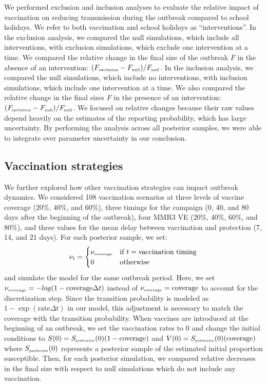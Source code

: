 \documentclass[12pt]{article}
\newcommand{\tsub}[2]{#1_{{\textrm{\tiny #2}}}}
\begin{document}
We performed exclusion and inclusion analyses to evaluate the relative impact of vaccination on reducing transmission during the outbreak compared to school holidays.
We refer to both vaccination and school holidays as ``interventions''.
In the exclusion analysis, we compared the null simulations, which include all interventions, with exclusion simulations, which exclude one intervention at a time.
We compared the relative change in the final size of the outbreak $F$ in the absence of an intervention: $(\tsub{F}{exclusion}-\tsub{F}{null})/\tsub{F}{null}$.
In the inclusion analysis, we compared the null simulations, which include no interventions, with inclusion simulations, which include one intervention at a time.
We also compared the relative change in the final sizes $F$ in the presence of an intervention: $(\tsub{F}{inclusion}-\tsub{F}{null})/\tsub{F}{null}$.
We focused on relative changes because their raw values depend heavily on the estimates of the reporting probability, which has large uncertainty.
By performing the analysis across all posterior samples, we were able to integrate over parameter uncertainty in our conclusion.

\subsection{Vaccination strategies}

We further explored how other vaccination strategies can impact outbreak dynamics.
We considered 108 vaccination scenarios at three levels of vaccine coverage (20\%, 40\%, and 60\%), three timings for the campaign (0, 40, and 80 days after the beginning of the outbreak), four MMR3 VE (20\%, 40\%, 60\%, and 80\%), and three values for the mean delay between vaccination and protection (7, 14, and 21 days).
For each posterior sample, we set:
\begin{equation}
\nu_t = \begin{cases}
\tsub{\nu}{coverage} & \textrm{if } t = \textrm{vaccination timing}\\
0 & \textrm{otherwise}
\end{cases}
\end{equation}
and simulate the model for the same outbreak period.
Here, we set $\tsub{\nu}{coverage} = -log(1-\textrm{coverage} \Delta t)$ instead of $\tsub{\nu}{coverage} = \textrm{coverage}$ to account for the discretization step.
Since the transition probability is modeled as $1-\exp(\mathrm{rate} \Delta t)$ in our model, this adjustment is necessary to match the coverage with the transition probability.
When vaccines are introduced at the beginning of an outbreak, we set the vaccination rates to 0 and change the initial conditions to $S(0) = \tsub{S}{posterior}(0) (1 - \textrm{coverage})$ and $V(0) = \tsub{S}{posterior}(0) (\textrm{coverage})$ where $\tsub{S}{posterior}(0)$ represents a posterior sample of the estimated initial proportion susceptible.
Then, for each posterior simulation, we compared relative decreases in the final size with respect to null simulations which do not include any vaccination.
\end{document}
